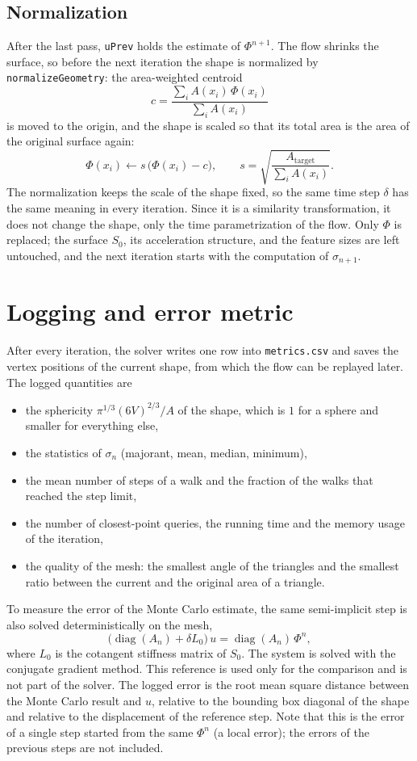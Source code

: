 \documentclass[
]{elteiktdk}[2024/04/26]
\begin{document}
	\subsection{Normalization}
	\label{sec:normalization}
	After the last pass, \texttt{uPrev} holds the estimate of $\Phi^{n+1}$. The flow shrinks the surface, so before the next iteration the shape is normalized by \texttt{normalizeGeometry}: the area-weighted centroid
	\[
	c = \frac{\sum_i A(x_i) \, \Phi(x_i)}{\sum_i A(x_i)}
	\]
	is moved to the origin, and the shape is scaled so that its total area is the area of the original surface again:
	\[
	\Phi(x_i) \leftarrow s \, \bigl(\Phi(x_i) - c\bigr), \qquad s = \sqrt{\frac{A_{\mathrm{target}}}{\sum_i A(x_i)}}.
	\]
	The normalization keeps the scale of the shape fixed, so the same time step $\delta$ has the same meaning in every iteration. Since it is a similarity transformation, it does not change the shape, only the time parametrization of the flow. Only $\Phi$ is replaced; the surface $S_0$, its acceleration structure, and the feature sizes are left untouched, and the next iteration starts with the computation of $\sigma_{n+1}$.
	
	\section{Logging and error metric}
	\label{sec:logging}
	After every iteration, the solver writes one row into \texttt{metrics.csv} and saves the vertex positions of the current shape, from which the flow can be replayed later. The logged quantities are
	\begin{itemize}
		\item the sphericity $\pi^{1/3} (6V)^{2/3} / A$ of the shape, which is $1$ for a sphere and smaller for everything else,
		\item the statistics of $\sigma_n$ (majorant, mean, median, minimum),
		\item the mean number of steps of a walk and the fraction of the walks that reached the step limit,
		\item the number of closest-point queries, the running time and the memory usage of the iteration,
		\item the quality of the mesh: the smallest angle of the triangles and the smallest ratio between the current and the original area of a triangle.
	\end{itemize}
	To measure the error of the Monte Carlo estimate, the same semi-implicit step is also solved deterministically on the mesh,
	\[
	\bigl(\operatorname{diag}(A_n) + \delta L_0\bigr) \, u = \operatorname{diag}(A_n) \, \Phi^n,
	\]
	where $L_0$ is the cotangent stiffness matrix of $S_0$. The system is solved with the conjugate gradient method. This reference is used only for the comparison and is not part of the solver. The logged error is the root mean square distance between the Monte Carlo result and $u$, relative to the bounding box diagonal of the shape and relative to the displacement of the reference step. Note that this is the error of a single step started from the same $\Phi^n$ (a local error); the errors of the previous steps are not included.
	
\end{document}
